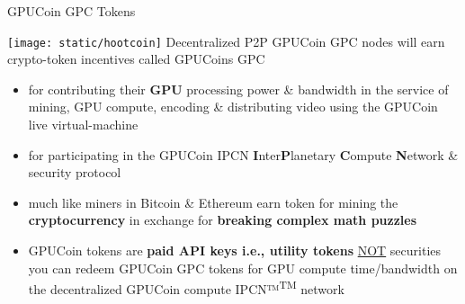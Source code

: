 
\begin{frame}[t]{GPUCoin GPC Tokens }
 
\texttt{[image: static/hootcoin]} Decentralized P2P	 GPUCoin GPC nodes will earn crypto-token incentives called GPUCoins GPC

 \begin{itemize}[<+-| alert@+>]
 \item for contributing their \textbf{GPU} processing power \& bandwidth in the service of mining, GPU compute, encoding \& distributing video using the GPUCoin live virtual-machine 
 \item for participating in the GPUCoin IPCN \textbf{I}nter\textbf{P}lanetary \textbf{C}ompute \textbf{N}etwork \& security protocol
 \item much like miners in Bitcoin \& Ethereum earn token for mining the \textbf{cryptocurrency} in exchange for \textbf{breaking complex math puzzles}
 \item GPUCoin tokens are \textbf{paid API keys i.e., utility tokens} \underline{NOT} securities you can redeem GPUCoin GPC  tokens for GPU compute time/bandwidth on the decentralized GPUCoin compute IPCN™\textsuperscript{TM}  network
 \end{itemize}
 
\end{frame}